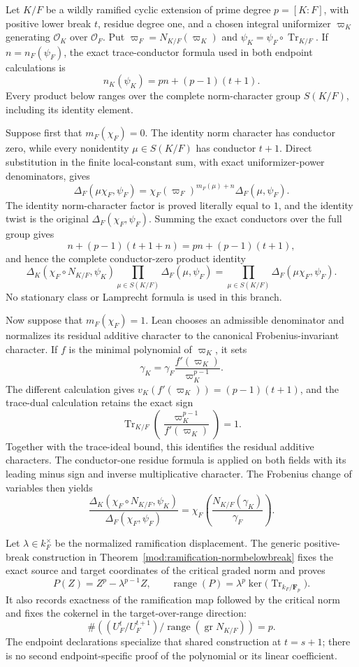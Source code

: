 \begin{theorem}
\label{mod:cases-wildendpoints}
Let $K/F$ be a wildly ramified cyclic extension of prime degree
$p=[K:F]$, with positive lower break $t$, residue degree one, and a chosen
integral uniformizer $\varpi_K$ generating $\mathcal O_K$ over
$\mathcal O_F$.  Put $\varpi_F=N_{K/F}(\varpi_K)$ and
$\psi_K=\psi_F\circ\operatorname{Tr}_{K/F}$.  If
$n=n_F(\psi_F)$, the exact trace-conductor formula used in both endpoint
calculations is
\[
 n_K(\psi_K)=pn+(p-1)(t+1).
\]
Every product below ranges over the complete norm-character group
$S(K/F)$, including its identity element.

Suppose first that $m_F(\chi_F)=0$.  The identity norm character has
conductor zero, while every nonidentity $\mu\in S(K/F)$ has conductor
$t+1$.  Direct substitution in the finite local-constant sum, with exact
uniformizer-power denominators, gives
\[
 \Delta_F(\mu\chi_F,\psi_F)
 =\chi_F(\varpi_F)^{m_F(\mu)+n}
   \Delta_F(\mu,\psi_F).
\]
The identity norm-character factor is proved literally equal to $1$, and
the identity twist is the original $\Delta_F(\chi_F,\psi_F)$.  Summing
the exact conductors over the full group gives
\[
 n+(p-1)(t+1+n)=pn+(p-1)(t+1),
\]
and hence the complete conductor-zero product identity
\[
 \Delta_K(\chi_F\circ N_{K/F},\psi_K)
 \prod_{\mu\in S(K/F)}\Delta_F(\mu,\psi_F)
 =
 \prod_{\mu\in S(K/F)}\Delta_F(\mu\chi_F,\psi_F).
\]
No stationary class or Lamprecht formula is used in this branch.

Now suppose that $m_F(\chi_F)=1$.  Lean chooses an admissible denominator
and normalizes its residual additive character to the canonical
Frobenius-invariant character.  If $f$ is the minimal polynomial of
$\varpi_K$, it sets
\[
 \gamma_K=\gamma_F\frac{f'(\varpi_K)}{\varpi_K^{p-1}}.
\]
The different calculation gives
$v_K(f'(\varpi_K))=(p-1)(t+1)$, and the trace-dual calculation retains the
exact sign
\[
 \operatorname{Tr}_{K/F}
   \left(\frac{\varpi_K^{p-1}}{f'(\varpi_K)}\right)=1.
\]
Together with the trace-ideal bound, this identifies the residual additive
characters.  The conductor-one residue formula is applied on both fields
with its leading minus sign and inverse multiplicative character.  The
Frobenius change of variables then yields
\[
 \frac{\Delta_K(\chi_F\circ N_{K/F},\psi_K)}
      {\Delta_F(\chi_F,\psi_F)}
 =\chi_F\left(\frac{N_{K/F}(\gamma_K)}{\gamma_F}\right).
\]

Let $\lambda\in k_F^\times$ be the normalized ramification displacement.
The generic positive-break construction in
Theorem~\ref{mod:ramification-normbelowbreak} fixes the exact source and
target coordinates of the critical graded norm and proves
\[
 P(Z)=Z^p-\lambda^{p-1}Z,
 \qquad
 \operatorname{range}(P)
   =\lambda^p\ker\bigl(\operatorname{Tr}_{k_F/\mathbf F_p}\bigr).
\]
It also records exactness of the ramification map followed by the critical
norm and fixes the cokernel in the target-over-range direction:
\[
 \#\left(
   (U_F^t/U_F^{t+1})/
   \operatorname{range}(\operatorname{gr}N_{K/F})
 \right)=p.
\]
The endpoint declarations specialize that shared construction at
$t=s+1$; there is no second endpoint-specific proof of the polynomial or
its linear coefficient.


\end{theorem}
